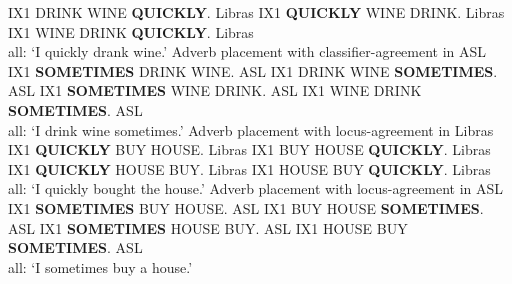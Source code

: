 \documentclass[output=paper,colorlinks,citecolor=brown,
]{langscibook}
\begin{document}
    \ex 
        IX1 DRINK\laszHs{\laszClaw} WINE \textbf{QUICKLY}.
        \hfill \cmark Libras
    \ex 
        IX1 \textbf{QUICKLY} WINE DRINK\laszHs{\laszClaw}.
        \hfill \cmark Libras
    \ex 
        IX1 WINE DRINK\laszHs{\laszClaw} \textbf{QUICKLY}. 
        \hfill \cmark Libras
        \\ 
        all: ‘I quickly drank wine.’
    \z 
\ex 
    \label{lasz:ex:25}
    Adverb placement with classifier-agreement in ASL
    \ea 
        IX1 \textbf{SOMETIMES} DRINK\laszHs{\laszClaw} WINE.
        \hfill \cmark ASL
    \ex 
        IX1 DRINK\laszHs{\laszClaw} WINE \textbf{SOMETIMES}.
        \hfill \cmark ASL
    \ex 
        IX1 \textbf{SOMETIMES} WINE DRINK\laszHs{\laszClaw}.
        \hfill \cmark ASL
    \ex 
        IX1 WINE DRINK\laszHs{\laszClaw} \textbf{SOMETIMES}. 
        \hfill \cmark ASL
        \\ 
        all: ‘I drink wine sometimes.’
    \z 
\ex 
    \label{lasz:ex:26}
    Adverb placement with locus-agreement in Libras
    \ea 
        IX1 \textbf{QUICKLY} BUY HOUSE.
        \hfill \cmark Libras
    \ex 
        IX1 BUY HOUSE \textbf{QUICKLY}.
        \hfill \cmark Libras
    \ex 
        IX1 \textbf{QUICKLY} HOUSE BUY.
        \hfill \cmark Libras
    \ex 
        IX1 HOUSE BUY \textbf{QUICKLY}. 
        \hfill \cmark Libras
        \\ 
        all: ‘I quickly bought the house.’
    \z 
\ex
    \label{lasz:ex:27}
    Adverb placement with locus-agreement in ASL
    \ea 
        IX1 \textbf{SOMETIMES} BUY HOUSE.
        \hfill \cmark ASL
    \ex 
        IX1 BUY HOUSE \textbf{SOMETIMES}.
        \hfill \cmark ASL
    \ex 
        IX1 \textbf{SOMETIMES} HOUSE BUY.
        \hfill \cmark ASL
    \ex 
        IX1 HOUSE BUY \textbf{SOMETIMES}. 
        \hfill \cmark ASL
        \\ 
        all: `I sometimes buy a house.' 
    \z 
\z 
\end{document}

